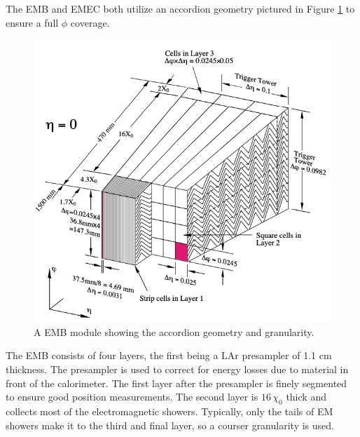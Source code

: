 		The EMB and EMEC both utilize an accordion geometry pictured in Figure \ref{fig:LAr-accordion} to ensure a full $\phi$ coverage. 
		\begin{figure}[!ht]
		\centering
		\includegraphics[width=.45\textwidth,keepaspectratio=true]{chapters/chapter2_experiment/images/LAr_Accordion_Geometry.png}
		\caption{ A EMB module showing the accordion geometry and granularity. \cite{atlas-experiment}}
		\label{fig:LAr-accordion}
		\end{figure}
		The EMB consists of four layers, the first being a LAr presampler of 1.1 cm thickness. The presampler is used to correct for energy losses due to material in front of the calorimeter. The first layer after the presampler is finely segmented to ensure good position measurements. The second layer is $16 \, \chi_0$ thick and collects most of the electromagnetic showers. Typically, only the tails of EM showers make it to the third and final layer, so a courser granularity is used. 

